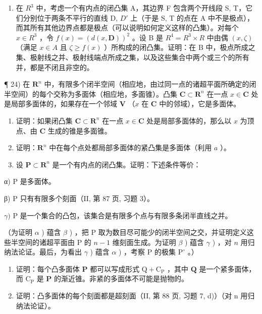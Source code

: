 \begin{enumerate}
\def\labelenumi{\arabic{enumi})}
\setcounter{enumi}{22}
\tightlist
\item
  在 \(R^{3}\) 中，考虑一个有内点的闭凸集 A，其边界 F 包含两个开线段 S, T，它们分别位于两条不平行的直线 D, \(D'\) 上（于是 S, T 的点在 A 中不是极点），而其所有其他边界点都是极点（可以说明如何定义这样的凸集）。对每个 \(x \in R^{3}\) ，令 \(f(x) = (d(x, \mathbf{D}))^{2}\) 。设 B 是 \(R^{4} = R^{3} \times R\) 中由偶 \((x, \zeta)\) （满足 \(x \in A\) 且 \(\zeta \geqslant f(x)\) ）所构成的闭凸集。证明：在 B 中，极点所成之集、极射线之并、极射线端点所成之集，以及这些集合中两个或三个的所有并，都是不闭且非空的。
\end{enumerate}

¶ 24) 在 \(\mathbf{R}^n\) 中，有限多个闭半空间（相应地，由过同一点的诸超平面所确定的闭半空间）的每个交称为多面体（相应地，多面锥）。凸集 \(\mathbf{C} \subset \mathbf{R}^n\) 在一点 \(x \in \mathbf{C}\) 处是局部多面体的，如果存在一个邻域 \(\mathbf{V}\) （\(x\) 在 \(\mathbf{C}\) 中的邻域），它是多面体。

\begin{enumerate}
\def\labelenumi{\alph{enumi})}
\item
  证明：如果闭凸集 \(\mathbf{C} \subset \mathbf{R}^n\) 在一点 \(x \in \mathbf{C}\) 处是局部多面体的，那么以 \(x\) 为顶点、由 \(\mathbf{C}\) 生成的锥是多面锥。
\item
  证明：\(\mathbf{R}^n\) 中在每个点处都局部多面体的紧凸集是多面体（利用 \(a\) ）。
\item
  设 \(\mathbf{P} \subset \mathbf{R}^n\) 是一个有内点的闭凸集。证明：下述条件等价：
\end{enumerate}

α) P 是多面体。

β) P 只有有限多个刻面（II, 第 87 页, 习题 3）。

\(\gamma)\) P 是一个集合的凸包，该集合是有限多个点与有限多条闭半直线之并。

（为证明 \(\alpha\) ) 蕴含 \(\beta\) ) ，把 P 取为数目尽可能少的闭半空间之交，并证明定义这些半空间的诸超平面由 P 的 \(n - 1\) 维刻面生成。为证明 \(\beta\) ) 蕴含 \(\gamma\) ) ，对 \(n\) 用归纳法论证。最后，为看出 \(\gamma\) ) 蕴含 \(\alpha\) ) ，考察 P 的极集 \(\mathrm{P}^{\circ}\) 。）

\begin{enumerate}
\def\labelenumi{\alph{enumi})}
\setcounter{enumi}{3}
\item
  证明：每个凸多面体 \(\mathbf{P}\) 都可以写成形式 \(\mathrm{Q} + \mathrm{C}_{\mathrm{P}}\) ，其中 \(\mathbf{Q}\) 是一个紧多面体，而 \(\mathrm{C}_{\mathrm{P}}\) 是 \(\mathbf{P}\) 的渐近锥。非紧的多面体不可能是抛物的。
\item
  证明：凸多面体的每个刻面都是超刻面（II, 第 88 页, 习题 7, d)）（对 n 用归纳法论证）。
\end{enumerate}

